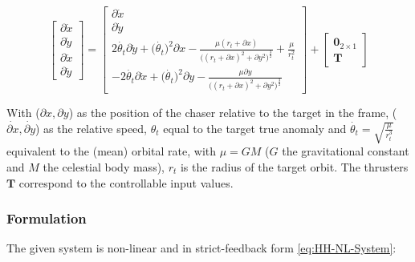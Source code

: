 \begin{equation}
  \begin{bmatrix} \partial \dot{x} \\ \partial \dot{y} \\  \partial\ddot{ x } \\ \partial\ddot{ y} \end{bmatrix} = \begin{bmatrix}
  \partial\dot{ x } \\ \partial\dot{ y } \\ 2\dot{\theta_t}\partial\dot{y} + \bigl(\dot{\theta_t}\bigr)^2 \partial x - \frac{\mu(r_t + \partial x)}{\bigl((r_t + \partial x)^2 + \partial y^2\bigr)^{\frac{3}{2}}} + \frac{\mu}{r_t^2}  \\ -2\dot{\theta_t}\partial\dot{x} + \bigl(\dot{\theta_t}\bigr)^2 \partial y - \frac{\mu \partial y}{\bigl((r_t + \partial x)^2 + \partial y^2\bigr)^{\frac{3}{2}}} 
  \end{bmatrix} + \begin{bmatrix}
  \mathbf{0}_{2 \times 1} \\ \mathbf{T}
  \end{bmatrix}
  \label{eq:orbital_dynamics}
\end{equation}

With (\( \partial x, \partial y\)) as the position of the chaser relative to the target in the  frame, (\(\dot{\partial x}, \dot{\partial y}\)) as the relative speed, \(\theta_t\) equal to the target true anomaly and \(\dot{\theta_t} = \sqrt{\frac{\mu}{r_t^3}}\) equivalent to the (mean) orbital rate, with \(\mu = GM\) (\(G\) the gravitational constant and \(M\) the celestial body mass), \(r_t\) is the radius of the target orbit. The thrusters\(\mathbf{T}\) correspond to the controllable input values.

\newpage

\subsubsection{ Formulation}
\label{subsubsec:Orbital_CLF-CBF_Experiment_Setup}

The given system is non-linear and in strict-feedback form \ref{eq:HH-NL-System}:

